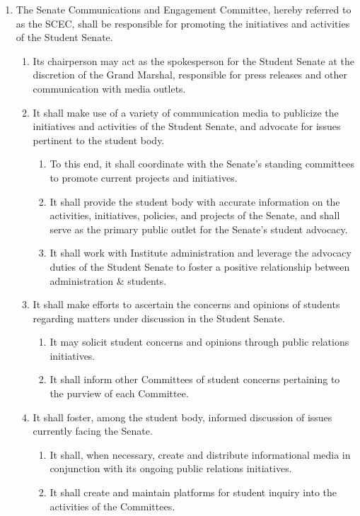 \begin{enumerate}
\begin{enumerate}
  \end{enumerate}
\item The Senate Communications and Engagement Committee, hereby referred to as the SCEC, shall be responsible for promoting the initiatives and activities of the Student Senate.
  \begin{enumerate}
  \item Its chairperson may act as the spokesperson for the Student Senate at the discretion of the Grand Marshal, responsible for press releases and other communication with media outlets.
  \item It shall make use of a variety of communication media to publicize the initiatives and activities of the Student Senate, and advocate for issues pertinent to the student body.
    \begin{enumerate}
    \item To this end, it shall coordinate with the Senate’s standing committees to promote current projects and initiatives.
    \item It shall provide the student body with accurate information on the activities, initiatives, policies, and projects of the Senate, and shall serve as the primary public outlet for the Senate’s student advocacy.
    \item It shall work with Institute administration and leverage the advocacy duties of the Student Senate to foster a positive relationship between administration \& students.
    \end{enumerate}
  \item It shall make efforts to ascertain the concerns and opinions of students regarding matters under discussion in the Student Senate.
    \begin{enumerate}
    \item It may solicit student concerns and opinions through public relations initiatives.
    \item It shall inform other Committees of student concerns pertaining to the purview of each Committee.
    \end{enumerate}
  \item It shall foster, among the student body, informed discussion of issues currently facing the Senate.
    \begin{enumerate}
    \item It shall, when necessary, create and distribute informational media in conjunction with its ongoing public relations initiatives.
    \item It shall create and maintain platforms for student inquiry into the activities of the Committees.

\end{enumerate}
\end{enumerate}
\end{enumerate}
